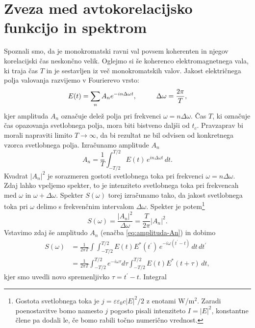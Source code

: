 \section{Zveza med avtokorelacijsko funkcijo in spektrom}

Spoznali smo, da je monokromatski ravni val povsem koherenten in njegov
korelacijski čas neskončno velik. Oglejmo si še koherenco elektromagnetnega
vala, ki traja čas $T$ in je sestavljen iz več monokromatskih valov. Jakost električnega
polja valovanja razvijemo v Fourierevo vrsto: 
\begin{equation}
E(t)=\sum_{n}A_{n}e^{-in\Delta\omega t},\mbox{\hskip1cm}\Delta\omega=\frac{2\pi}{T},
\end{equation}
kjer amplituda $A_{n}$ označuje delež polja pri frekvenci $\omega=n\Delta\omega$.
Čas $T$, ki označuje čas opazovanja svetlobnega polja, mora biti
bistveno daljši od $t_{c}$. Pravzaprav bi morali napraviti limito
$T\rightarrow\infty$, da bi rezultat ne bil odvisen od konkretnega
vzorca svetlobnega polja. Izračunamo amplitude $A_{n}$ 
\begin{equation}
A_{n}=\frac{1}{T}\int_{-T/2}^{T/2}E(t)\, e^{in\Delta\omega t}\, dt.\label{eq:amplituda-An}
\end{equation}
Kvadrat $|A_{n}|^{2}$ je sorazmeren gostoti svetlobnega toka pri frekvenci
$\omega=n\Delta\omega$. 
Zdaj lahko vpeljemo spekter, to
je intenziteto svetlobnega toka pri frekvencah med $\omega$ in $\omega+\Delta\omega$.
Spekter $S(\omega)$ torej izračunamo tako, da jakost svetlobnega
toka pri $\omega$ delimo s frekvenčnim intervalom 
$\Delta\omega$.
Spekter je potem\footnote{Gostota svetlobnega toka 
je $j = \varepsilon \varepsilon_0 c |E|^2/2$
z enotami W/m$^2$. Zaradi poenostavitve bomo namesto $j$ pogosto pisali intenziteto 
$I = |E|^2$, konstantne člene pa dodali le, če bomo rabili točno numerično vrednost.} 
\begin{equation}
S(\omega)=\frac{|A_{n}|^{2}}{\Delta\omega}=\frac{T}{2\pi}|A_{n}|^{2}.
\end{equation}
Vstavimo zdaj še amplitudo $A_{n}$ (enačba \ref{eq:amplituda-An}) in dobimo 
\begin{align}
S(\omega) & =\frac{1}{2\pi T}\int\int_{-T/2}^{T/2}E(t)E^{*}(t^{\prime})\, 
e^{-i\omega(t^{\prime}-t)}\, dt\, dt^{\prime}\\
 & =\frac{1}{2\pi T}\int_{-T/2}^{T/2}e^{-i\omega\tau}d\tau\int_{-T/2}^{T/2}E(t)E^{*}(t+\tau)\, dt,
\label{eq:spekter}
\end{align}
kjer smo uvedli novo spremenljivko $\tau=t^{\prime}-t$. Integral
